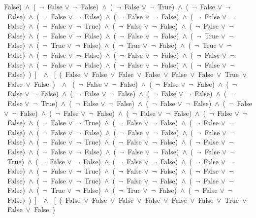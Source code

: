 ﻿\documentclass[a4paper,10pt]{article}
\begin{document}
False)\ $\wedge$\ (\  $\neg$\ False $\vee$\  $\neg$\ False)\ $\wedge$\ (\  $\neg$\ False $\vee$\  $\neg$\ True)\ $\wedge$\ (\  $\neg$\ False $\vee$\  $\neg$\ False)\ $\wedge$\ (\  $\neg$\ False $\vee$\  $\neg$\ False)\ $\wedge$\ (\  $\neg$\ False $\vee$\  $\neg$\ False)\ $\wedge$\ (\  $\neg$\ False $\vee$\  $\neg$\ False)\ $\wedge$\ (\  $\neg$\ False $\vee$\  $\neg$\ True)\ $\wedge$\ (\  $\neg$\ False $\vee$\  $\neg$\ False)\ $\wedge$\ (\  $\neg$\ False $\vee$\  $\neg$\ False)\ $\wedge$\ (\  $\neg$\ False $\vee$\  $\neg$\ False)\ $\wedge$\ (\  $\neg$\ False $\vee$\  $\neg$\ False)\ $\wedge$\ (\  $\neg$\ True $\vee$\  $\neg$\ False)\ $\wedge$\ (\  $\neg$\ True $\vee$\  $\neg$\ False)\ $\wedge$\ (\  $\neg$\ True $\vee$\  $\neg$\ False)\ $\wedge$\ (\  $\neg$\ True $\vee$\  $\neg$\ False)\ $\wedge$\ (\  $\neg$\ False $\vee$\  $\neg$\ False)\ $\wedge$\ (\  $\neg$\ False $\vee$\  $\neg$\ False)\ $\wedge$\ (\  $\neg$\ False $\vee$\  $\neg$\ False)\ $\wedge$\ (\  $\neg$\ False $\vee$\  $\neg$\ False)\ $\wedge$\ (\  $\neg$\ False $\vee$\  $\neg$\ False)\ $\wedge$\ (\  $\neg$\ False $\vee$\  $\neg$\ False)\ )\ ]\ \ $\wedge$ \ [\ (\ False\ $\vee$\ False\ $\vee$\ False\ $\vee$\ False\ $\vee$\ False\ $\vee$\ False\ $\vee$\ True\ $\vee$\ False\ $\vee$\ False\ )\ \ $\wedge$ \ (\  $\neg$\ False $\vee$\  $\neg$\ False)\ $\wedge$\ (\  $\neg$\ False $\vee$\  $\neg$\ False)\ $\wedge$\ (\  $\neg$\ False $\vee$\  $\neg$\ False)\ $\wedge$\ (\  $\neg$\ False $\vee$\  $\neg$\ False)\ $\wedge$\ (\  $\neg$\ False $\vee$\  $\neg$\ False)\ $\wedge$\ (\  $\neg$\ False $\vee$\  $\neg$\ True)\ $\wedge$\ (\  $\neg$\ False $\vee$\  $\neg$\ False)\ $\wedge$\ (\  $\neg$\ False $\vee$\  $\neg$\ False)\ $\wedge$\ (\  $\neg$\ False $\vee$\  $\neg$\ False)\ $\wedge$\ (\  $\neg$\ False $\vee$\  $\neg$\ False)\ $\wedge$\ (\  $\neg$\ False $\vee$\  $\neg$\ False)\ $\wedge$\ (\  $\neg$\ False $\vee$\  $\neg$\ False)\ $\wedge$\ (\  $\neg$\ False $\vee$\  $\neg$\ True)\ $\wedge$\ (\  $\neg$\ False $\vee$\  $\neg$\ False)\ $\wedge$\ (\  $\neg$\ False $\vee$\  $\neg$\ False)\ $\wedge$\ (\  $\neg$\ False $\vee$\  $\neg$\ False)\ $\wedge$\ (\  $\neg$\ False $\vee$\  $\neg$\ False)\ $\wedge$\ (\  $\neg$\ False $\vee$\  $\neg$\ False)\ $\wedge$\ (\  $\neg$\ False $\vee$\  $\neg$\ True)\ $\wedge$\ (\  $\neg$\ False $\vee$\  $\neg$\ False)\ $\wedge$\ (\  $\neg$\ False $\vee$\  $\neg$\ False)\ $\wedge$\ (\  $\neg$\ False $\vee$\  $\neg$\ False)\ $\wedge$\ (\  $\neg$\ False $\vee$\  $\neg$\ False)\ $\wedge$\ (\  $\neg$\ False $\vee$\  $\neg$\ True)\ $\wedge$\ (\  $\neg$\ False $\vee$\  $\neg$\ False)\ $\wedge$\ (\  $\neg$\ False $\vee$\  $\neg$\ False)\ $\wedge$\ (\  $\neg$\ False $\vee$\  $\neg$\ False)\ $\wedge$\ (\  $\neg$\ False $\vee$\  $\neg$\ True)\ $\wedge$\ (\  $\neg$\ False $\vee$\  $\neg$\ False)\ $\wedge$\ (\  $\neg$\ False $\vee$\  $\neg$\ False)\ $\wedge$\ (\  $\neg$\ False $\vee$\  $\neg$\ True)\ $\wedge$\ (\  $\neg$\ False $\vee$\  $\neg$\ False)\ $\wedge$\ (\  $\neg$\ False $\vee$\  $\neg$\ False)\ $\wedge$\ (\  $\neg$\ True $\vee$\  $\neg$\ False)\ $\wedge$\ (\  $\neg$\ True $\vee$\  $\neg$\ False)\ $\wedge$\ (\  $\neg$\ False $\vee$\  $\neg$\ False)\ )\ ]\ \ $\wedge$ \ [\ (\ False\ $\vee$\ False\ $\vee$\ False\ $\vee$\ False\ $\vee$\ False\ $\vee$\ False\ $\vee$\ True\ $\vee$\ False\ $\vee$\ False\ )\ \ 
\end{document}
